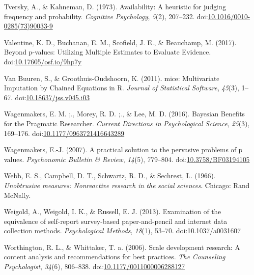 \documentclass[english,man, mask]{apa6}
\theoremstyle{definition}
\theoremstyle{definition}
\theoremstyle{definition}
\theoremstyle{remark}
\begin{document}
\hypertarget{ref-Tversky1973}{}
Tversky, A., \& Kahneman, D. (1973). Availability: A heuristic for
judging frequency and probability. \emph{Cognitive Psychology},
\emph{5}(2), 207--232.
doi:\href{https://doi.org/10.1016/0010-0285(73)90033-9}{10.1016/0010-0285(73)90033-9}

\hypertarget{ref-Valentine2017}{}
Valentine, K. D., Buchanan, E. M., Scofield, J. E., \& Beauchamp, M.
(2017). Beyond p-values: Utilizing Multiple Estimates to Evaluate
Evidence.
doi:\href{https://doi.org/10.17605/osf.io/9hp7y}{10.17605/osf.io/9hp7y}

\hypertarget{ref-VanBuuren2011}{}
Van Buuren, S., \& Groothuis-Oudshoorn, K. (2011). mice: Multivariate
Imputation by Chained Equations in R. \emph{Journal of Statistical
Software}, \emph{45}(3), 1--67.
doi:\href{https://doi.org/10.18637/jss.v045.i03}{10.18637/jss.v045.i03}

\hypertarget{ref-Wagenmakers2016}{}
Wagenmakers, E. M. ;., Morey, R. D. ;., \& Lee, M. D. (2016). Bayesian
Benefits for the Pragmatic Researcher. \emph{Current Directions in
Psychological Science}, \emph{25}(3), 169--176.
doi:\href{https://doi.org/10.1177/0963721416643289}{10.1177/0963721416643289}

\hypertarget{ref-Wagenmakers2007}{}
Wagenmakers, E.-J. (2007). A practical solution to the pervasive
problems of p values. \emph{Psychonomic Bulletin \& Review},
\emph{14}(5), 779--804.
doi:\href{https://doi.org/10.3758/BF03194105}{10.3758/BF03194105}

\hypertarget{ref-Webb1966}{}
Webb, E. S., Campbell, D. T., Schwartz, R. D., \& Sechrest, L. (1966).
\emph{Unobtrusive measures: Nonreactive research in the social
sciences}. Chicago: Rand McNally.

\hypertarget{ref-Weigold2013}{}
Weigold, A., Weigold, I. K., \& Russell, E. J. (2013). Examination of
the equivalence of self-report survey-based paper-and-pencil and
internet data collection methods. \emph{Psychological Methods},
\emph{18}(1), 53--70.
doi:\href{https://doi.org/10.1037/a0031607}{10.1037/a0031607}

\hypertarget{ref-Worthington2006}{}
Worthington, R. L., \& Whittaker, T. a. (2006). Scale development
research: A content analysis and recommendations for best practices.
\emph{The Counseling Psychologist}, \emph{34}(6), 806--838.
doi:\href{https://doi.org/10.1177/0011000006288127}{10.1177/0011000006288127}
\end{document}
